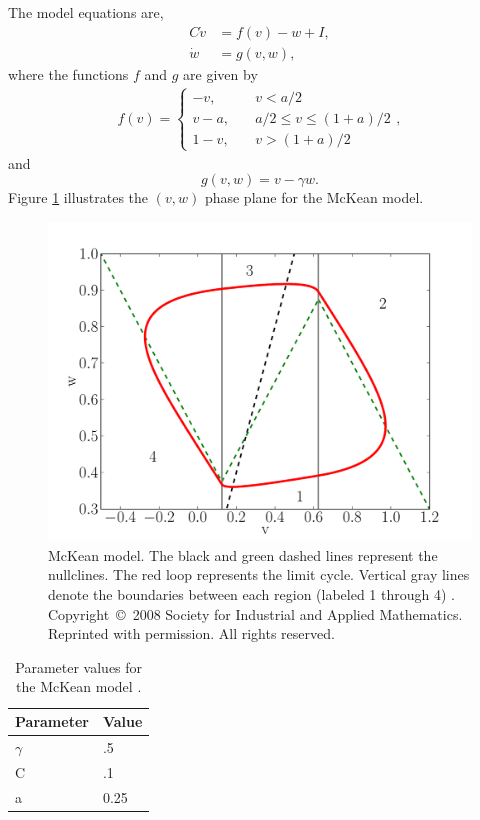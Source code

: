 \documentclass[12pt]{article}
\begin{document}
The model equations are,
\begin{equation}
 \begin{split}
  C \dot{v} &= f(v) - w + I,\\
  \dot{w} &= g(v,w),
 \end{split}
\label{eq:coombes-eqs}\end{equation}
where the functions $f$ and $g$ are given by
\begin{equation}
 \begin{split}
  f(v) = \left \{ \begin{array}{ll} -v,& \quad v< a/2  \\ v - a, & \quad a/2 \leq v \leq (1+a)/2 \\ 1- v, & \quad v >(1+a)/2 \end{array} \right . ,
 \end{split}
\end{equation}
and
\begin{equation}
 g(v,w) = v - \gamma w.
\end{equation}
Figure \ref{fig:mckean} illustrates the $(v,w)$ phase plane for the McKean model.
%
\begin{figure}[h!]
\includegraphics[width=\textwidth]{pmk_fig.pdf}
\caption[McKean model]{McKean model.  The black and green dashed lines represent the nullclines. The red loop represents the limit cycle.  Vertical gray lines denote the boundaries between each region (labeled 1 through 4) \cite{Coombes:2008:SIADS}. Copyright~\copyright~2008 Society for Industrial and Applied Mathematics.  Reprinted with permission.  All rights reserved.}
\label{fig:mckean}\end{figure}
%
\begin{table}[h!]
\centering
\caption{Parameter values for the McKean model \cite{Coombes:2008:SIADS}.}
    \begin{tabular}{  l | l }
    \hline
    Parameter & Value \\ \hline
    $\gamma$ & .5 \\ \hline
    C & .1 \\ \hline
    a & 0.25 
    \end{tabular}
\label{table:mckean-param}\end{table}
\end{document}

